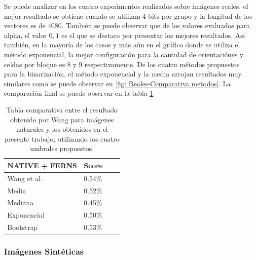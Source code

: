 \newpage

		Se puede analizar en los cuatro experimentos realizados sobre imágenes reales, el mejor resultado se obtiene cuando se utilizan $4$ bits por grupo y la longitud de los vectores es de $4080$. También se puede observar que de los valores evaluados para alpha, el valor $0,1$ es el que se destaco por presentar los mejores resultados. Asi también, en la mayoría de los casos y más aún en el gráfico donde se utiliza el método exponencial, la mejor configuración para la cantidad de orientaciónes y celdas por bloque es $8$ y $9$ respectivamente. De los cuatro métodos propuestos para la binarización, el método exponencial y la media arrojan resultados muy similares como se puede observar en \ref{fig: Reales-Comparativa metodos}. La comparación final se puede observar en la tabla \ref{table: reales-comparativa}
	\begin{table}
		\centering
		\begin{tabular}{ | l | l | l | p{5cm} |}
    			\hline
    				\textbf{NATIVE + FERNS} & \textbf{Score} \\ \hline
    				Wang et al. & 0.54\% \\ \hline
    				Media & 0.52\% \\ \hline
    				Mediana & 0.45\%\\ \hline
    				Exponencial & 0.50\% \\ \hline
    				Bootstrap & 0.53\%\\ 
    			\hline
    		\end{tabular}
    		\caption[Resultados imagenes naturales vs Wang]{Tabla comparativa entre el resultado obtenido por Wang para imágenes naturales y los obtenidos en el presente trabajo, utilizando los cuatro umbrales propuestos.}
    		\label{table: reales-comparativa}
    	\end{table}
    	
    	
    	\newpage
    	\subsubsection{Imágenes Sintéticas}
    	
